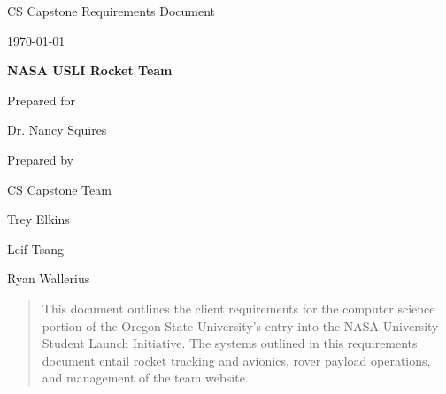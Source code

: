 \documentclass[onecolumn, draftclsnofoot, 10pt, compsoc]{IEEEtran}
\def \CapstoneTeamName{			Team 12}
\def \GroupName{				CS Capstone Team }
\def \GroupMemberOne{			Trey Elkins}
\def \GroupMemberTwo{			Leif Tsang}
\def \GroupMemberThree{			Ryan Wallerius}
\def \CapstoneProjectName{		NASA USLI Rocket Team}
\def \CapstoneSponsorCompany{	Oregon State University}
\def \CapstoneSponsorPerson{	Dr. Nancy Squires}
\def \DocType{		%
					Requirements Document
				}
\newcommand{\NameSigPair}[1]{
	\par
	\makebox[2.75in][r]{#1} \hfill
	\makebox[3.25in]{\makebox[2.25in]{\hrulefill} \hfill \makebox[.75in]{\hrulefill}}
	\par\vspace{-12pt}
	\textit{
		\tiny\noindent \makebox[2.75in]{} \hfill
		\makebox[3.25in]{\makebox[2.25in][r]{Signature} \hfill \makebox[.75in][r]{Date}}
	}
}
\renewcommand{\NameSigPair}[1]{#1}
\begin{document}
\begin{titlepage}
\begin{singlespace}
\begin{center}
        \par\vspace{.2in}
        \scshape{
            \huge CS Capstone \DocType \par
            {\large\today}\par
            \vspace{.5in}
            \textbf{\Huge\CapstoneProjectName}\par
            \vfill
            {\large Prepared for}\par
            \vspace{5pt}
            {\Large\NameSigPair{\CapstoneSponsorPerson}\par}
            {\large Prepared by }\par
           	\GroupName\par
            \vspace{5pt}
            {\Large
                \NameSigPair{\GroupMemberOne}\par
                \NameSigPair{\GroupMemberTwo}\par
                \NameSigPair{\GroupMemberThree}\par
            }
            \vspace{20pt}
        }
        \end{center}
    \end{singlespace}
    
    \begin{abstract}
        This document outlines the client requirements for the computer science portion of the Oregon State University's entry into the NASA University Student Launch Initiative. The systems outlined in this requirements document entail rocket tracking and avionics, rover payload operations, and management of the team website.
	\end{abstract}
\end{titlepage}
\newpage

\tableofcontents
\clearpage
\end{document}
